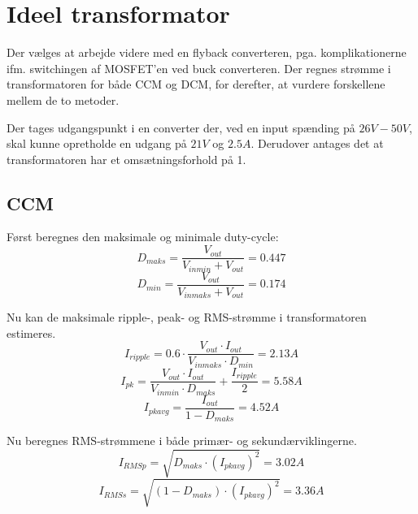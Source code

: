 \section{Ideel transformator}
Der vælges at arbejde videre med en flyback converteren, pga. komplikationerne ifm. switchingen af MOSFET'en ved buck converteren.
Der regnes strømme i transformatoren for både CCM og DCM, for derefter, at vurdere forskellene mellem de to metoder.

Der tages udgangspunkt i en converter der, ved en input spænding på $26V-50V$, skal kunne opretholde en udgang på $21V$ og $2.5A$. Derudover antages det at transformatoren har et omsætningsforhold på 1.

\subsection{CCM} \label{maksimum_duty_cycle}
Først beregnes den maksimale og minimale duty-cycle:
\begin{equation} \label{D_maks_CCM}
D_{maks} = \frac{V_{out}}{V_{inmin} + V_{out}} = 0.447
\end{equation}
\begin{equation} \label{D_min_CCM}
D_{min} = \frac{V_{out}}{V_{inmaks} + V_{out}} = 0.174
\end{equation}

\noindent Nu kan de maksimale ripple-, peak- og RMS-strømme i transformatoren estimeres. 
\begin{equation} \label{I_ripple_CCM}
I_{ripple} = 0.6 \cdot \frac{V_{out} \cdot I_{out}}{V_{inmaks} \cdot   D_{min}} = 2.13A
\end{equation}
\begin{equation} \label{I_pk_CCM}
I_{pk} = \frac{V_{out} \cdot I_{out}}{V_{inmin} \cdot D_{maks}} + \frac{I_{ripple}}{2} = 5.58A
\end{equation}
\begin{equation} \label{I_pk_avg_CCM}
I_{pkavg} = \frac{I_{out}}{1-D_{maks}} = 4.52A
\end{equation}

\noindent Nu beregnes RMS-strømmene i både primær- og sekundærviklingerne. 
\begin{equation} \label{I_p_RMS_CCM}
I_{RMSp} = \sqrt{D_{maks} \cdot (I_{pkavg})^2} = 3.02A
\end{equation}
\begin{equation} \label{I_s_RMS_CCM}
I_{RMSs} = \sqrt{(1-D_{maks}) \cdot (I_{pkavg})^2} = 3.36A
\end{equation}


